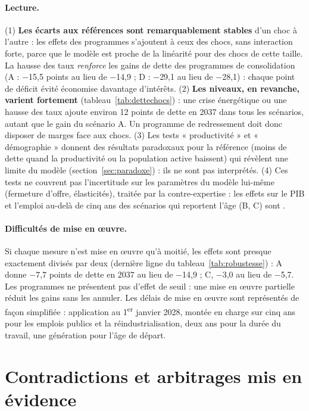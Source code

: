 \paragraph{Lecture.} (1) \textbf{Les écarts aux références sont remarquablement stables} d'un choc à l'autre : les effets
des programmes s'ajoutent à ceux des chocs, sans interaction forte, parce que le modèle est proche de la linéarité pour
des chocs de cette taille. La hausse des taux \emph{renforce} les gains de dette des programmes de consolidation (A : $-$15,5
points au lieu de $-$14,9 ; D : $-$29,1 au lieu de $-$28,1) : chaque point de déficit évité économise davantage d'intérêts.
(2) \textbf{Les niveaux, en revanche, varient fortement} (tableau~\ref{tab:dettechocs}) : une crise énergétique ou une
hausse des taux ajoute environ 12 points de dette en 2037 dans tous les scénarios, autant que le gain du scénario A. Un
programme de redressement doit donc disposer de marges face aux chocs. (3) Les tests « productivité » et « démographie »
donnent des résultats paradoxaux pour la référence (moins de dette quand la productivité ou la population active
baissent) qui révèlent une limite du modèle (section~\ref{sec:paradoxe}) : ils ne sont pas interprétés.
(4) Ces tests ne couvrent pas l'incertitude sur les paramètres du modèle lui-même (fermeture d'offre, élasticités),
traitée par la contre-expertise : les effets sur le PIB et l'emploi au-delà de cinq ans des scénarios qui reportent l'âge
(B, C) sont .

\paragraph{Difficultés de mise en œuvre.} Si chaque mesure n'est mise en œuvre qu'à moitié, les effets sont presque
exactement divisés par deux (dernière ligne du tableau~\ref{tab:robustesse}) : A donne $-$7,7 points de dette en 2037 au lieu
de $-$14,9 ; C, $-$3,0 au lieu de $-$5,7. Les programmes ne présentent pas d'effet de seuil : une mise en œuvre partielle
réduit les gains sans les annuler. Les délais de mise en œuvre sont représentés de façon simplifiée : application au
1\textsuperscript{er} janvier 2028, montée en charge sur cinq ans pour les emplois publics et la réindustrialisation, deux
ans pour la durée du travail, une génération pour l'âge de départ.

\section{Contradictions et arbitrages mis en évidence}

